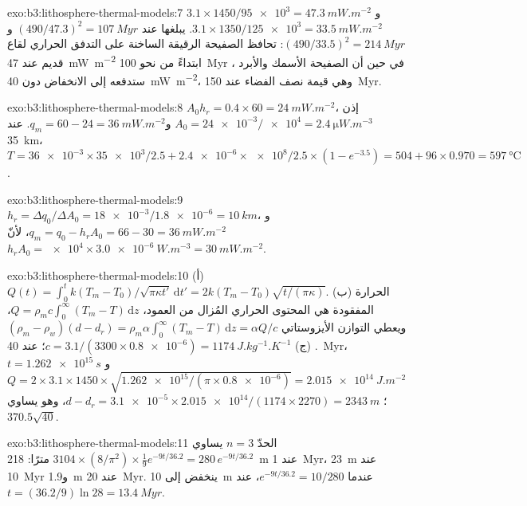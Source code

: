 \begin{solution}{exo:b3:lithosphere-thermal-models:7}
$3.1\times1450/\num{95e3} = \qty{47.3}{mW.m^{-2}}$ و$3.1\times1350/\num{125e3}
= \qty{33.5}{mW.m^{-2}}$. يبلغها  عند $(490/47.3)^2 =
\qty{107}{Myr}$ و$(490/33.5)^2 = \qty{214}{Myr}$: تحافظ الصفيحة الرقيقة الساخنة على
التدفق الحراري لقاع قديم عند \qty{47}{mW.m^{-2}} ابتداءً من نحو \qty{100}{Myr}
، في حين أن الصفيحة الأسمك والأبرد ستدفعه إلى الانخفاض دون
\qty{40}{mW.m^{-2}}، وهي قيمة نصف الفضاء عند \qty{150}{Myr}.
\end{solution}

\begin{solution}{exo:b3:lithosphere-thermal-models:8}
$A_0h_r = 0.4\times60 = \qty{24}{mW.m^{-2}}$، إذن $A_0 =
\num{24e-3}/\num{e4} = \qty{2.4}{\micro W.m^{-3}}$ و$q_m = 60 - 24 =
\qty{36}{mW.m^{-2}}$. عند \qty{35}{km}، $T = \num{36e-3}\times\num{35e3}/2.5 +
\num{2.4e-6}\times\num{e8}/2.5\times(1 - e^{-3.5}) = 504 + 96\times0.970 =
\qty{597}{\celsius}$.
\end{solution}

\begin{solution}{exo:b3:lithosphere-thermal-models:9}
$h_r = \Delta q_0/\Delta A_0 = \num{18e-3}/\num{1.8e-6} = \qty{10}{km}$،
و$q_m = q_0 - h_rA_0 = 66 - 30 = \qty{36}{mW.m^{-2}}$، لأنّ $h_rA_0 =
\num{e4}\times\qty{3.0e-6}{W.m^{-3}} = \qty{30}{mW.m^{-2}}$.
\end{solution}

\begin{solution}{exo:b3:lithosphere-thermal-models:10}
(أ) $Q(t) = \int_0^tk(T_m - T_0)/\sqrt{\pi\kappa t'}\,\mathrm dt' =
2k(T_m - T_0)\sqrt{t/(\pi\kappa)}$. (ب) الحرارة المفقودة هي المحتوى الحراري
المُزال من العمود، $Q = \rho_mc\int_0^\infty(T_m - T)\,\mathrm dz$،
ويعطي التوازن الأيزوستاتي $(\rho_m - \rho_w)(d - d_r) = \rho_m\alpha\int_0^\infty(T_m -
T)\,\mathrm dz = \alpha Q/c$. (ج) $c = 3.1/(3300\times\num{0.8e-6}) =
\qty{1174}{J.kg^{-1}.K^{-1}}$؛ عند \qty{40}{Myr}، $t = \qty{1.262e15}{s}$
و$Q = 2\times3.1\times1450\times\sqrt{\num{1.262e15}/(\pi\times\num{0.8e-6})} =
\qty{2.015e14}{J.m^{-2}}$؛ $d - d_r = \num{3.1e-5}\times\num{2.015e14}/
(1174\times2270) = \qty{2343}{m}$، وهو يساوي $370.5\sqrt{40}$.
\end{solution}

\begin{solution}{exo:b3:lithosphere-thermal-models:11}
الحدّ $n = 3$ يساوي $3104\times(8/\pi^2)\times\tfrac19e^{-9t/36.2} =
280\,e^{-9t/36.2}$ مترًا: \qty{218}{m} عند \qty{1}{Myr}، \qty{23}{m} عند
\qty{10}{Myr} و\qty{1.9}{m} عند \qty{20}{Myr}. ينخفض إلى \qty{10}{m} عندما
$e^{-9t/36.2} = 10/280$، عند $t = (36.2/9)\ln28 = \qty{13.4}{Myr}$.
\end{solution}

